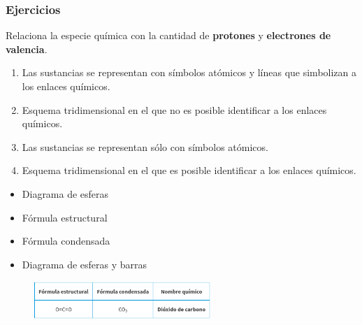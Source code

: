 \documentclass[11pt]{book}
\begin{document}
\subsubsection{Ejercicios}
\begin{boxK}
  Relaciona la especie química con la cantidad de \textbf{protones} y \textbf{electrones de valencia}.\\

  \begin{minipage}{0.6\textwidth}
    \begin{enumerate}
      \item Las sustancias se representan con símbolos atómicos y líneas que simbolizan a los enlaces químicos.
      \item Esquema tridimensional en el que no es posible identificar a los enlaces químicos.
      \item Las sustancias se representan sólo con símbolos atómicos.
      \item Esquema tridimensional en el que es posible identificar a los enlaces químicos.
    \end{enumerate}
  \end{minipage}\hfill
  \begin{minipage}{0.3\textwidth}
    \begin{itemize}
      \item[\rule{1cm}{0.2mm}] Diagrama de esferas\\
      \item[\rule{1cm}{0.2mm}] Fórmula estructural\\
      \item[\rule{1cm}{0.2mm}] Fórmula condensada\\
      \item[\rule{1cm}{0.2mm}] Diagrama de esferas y barras\\
    \end{itemize}
  \end{minipage}

\end{boxK}

\begin{figure}[H]
  \centering
  \includegraphics[width=0.6\textwidth]{formulas_co2.png}
  \label{fig:formulas_co2}
\end{figure}
\end{document}

